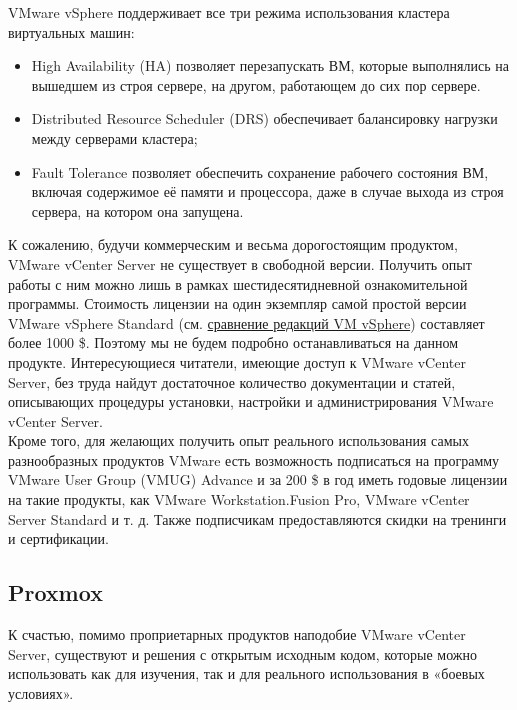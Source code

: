 \documentclass[14pt, a4paper]{article}
\begin{document}
VMware vSphere поддерживает все три режима использования кластера виртуальных машин:
\begin{itemize}
    \item High Availability (HA) позволяет перезапускать ВМ, которые выполнялись на вышедшем из
    строя сервере, на другом, работающем до сих пор сервере.
    \item Distributed Resource Scheduler (DRS) обеспечивает балансировку нагрузки между серверами
    кластера;
    \item Fault Tolerance позволяет обеспечить сохранение рабочего состояния ВМ, включая
    содержимое её памяти и процессора, даже в случае выхода из строя сервера, на котором она
    запущена.
\end{itemize}

К сожалению, будучи коммерческим и весьма дорогостоящим продуктом, VMware vCenter Server не
существует в свободной версии. Получить опыт работы с ним можно лишь в рамках
шестидесятидневной ознакомительной программы. Стоимость лицензии на один экземпляр самой
простой версии VMware vSphere Standard (см. \href{https://www.vmware.com/content/dam/digitalmarketing/vmware/en/pdf/vsphere/vmw-feature-comparison.pdf}{сравнение редакций VM vSphere}) составляет более
1000 \$. Поэтому мы не будем подробно останавливаться на данном продукте. Интересующиеся
читатели, имеющие доступ к VMware vCenter Server, без труда найдут достаточное количество
документации и статей, описывающих процедуры установки, настройки и администрирования VMware
vCenter Server.\\

Кроме того, для желающих получить опыт реального использования самых разнообразных продуктов
VMware есть возможность подписаться на программу VMware User Group (VMUG) Advance и за 200 \$
в год иметь годовые лицензии на такие продукты, как VMware Workstation.Fusion Pro, VMware vCenter
Server Standard и т. д. Также подписчикам предоставляются скидки на тренинги и сертификации.

\subsection*{Proxmox} 

К счастью, помимо проприетарных продуктов наподобие VMware vCenter Server, существуют и
решения с открытым исходным кодом, которые можно использовать как для изучения, так и для
реального использования в «боевых условиях».\\
\end{document}
